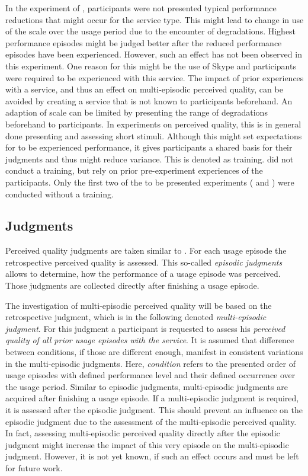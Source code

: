 In the experiment of \citet{moller_single-call_2011}, participants were not presented typical performance reductions that might occur for the service type.
This might lead to change in use of the scale over the usage period due to the encounter of degradations.
Highest performance episodes might be judged better after the reduced performance episodes have been experienced.
However, such an effect has not been observed in this experiment.
One reason for this might be the use of Skype and participants were required to be experienced with this service.
The impact of prior experiences with a service, and thus an effect on multi-episodic perceived quality, can be avoided by creating a service that is not known to participants beforehand.
An adaption of scale can be limited by presenting the range of degradations beforehand to participants.
In experiments on perceived quality, this is in general done presenting and assessing short stimuli.
Although this might set expectations for to be experienced performance, it gives participants a shared basis for their judgments and thus might reduce variance.
This is denoted as training.
\citet{moller_single-call_2011} did not conduct a training, but rely on prior pre-experiment experiences of the participants.
Only the first two of the to be presented experiments ( and ) were conducted without a training.

\subsection{Judgments}
Perceived quality judgments are taken similar to \citet{moller_single-call_2011}.
For each usage episode the retrospective perceived quality is assessed.
This so-called \emph{episodic judgments} allows to determine, how the performance of a usage episode was perceived.
Those judgments are collected directly after finishing a usage episode.

The investigation of multi-episodic perceived quality will be based on the retrospective judgment, which is in the following denoted \emph{multi-episodic judgment}.
For this judgment a participant is requested to assess his \emph{perceived quality of all prior usage episodes with the service}.
It is assumed that difference between conditions, if those are different enough, manifest in consistent variations in the multi-episodic judgments.
Here, \emph{condition} refers to the presented order of usage episodes with defined performance level and their defined occurrence over the usage period.
Similar to episodic judgments, multi-episodic judgments are acquired after finishing a usage episode.
If a multi-episodic judgment is required, it is assessed after the episodic judgment.
This should prevent an influence on the episodic judgment due to the assessment of the multi-episodic perceived quality.
In fact, assessing multi-episodic perceived quality directly after the episodic judgment might increase the impact of this very episode on the multi-episodic judgment.
However, it is not yet known, if such an effect occurs and must be left for future work.

